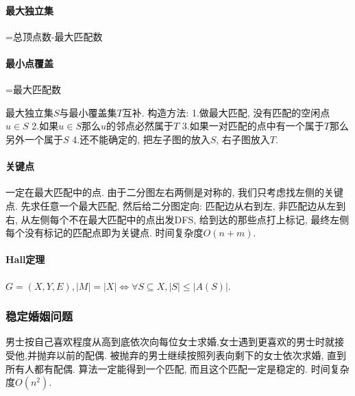        \paragraph{最大独立集}=总顶点数-最大匹配数
        \paragraph{最小点覆盖}=最大匹配数

        最大独立集$S$与最小覆盖集$T$互补. 构造方法: 1.做最大匹配, 没有匹配的空闲点$u\in S$ 2.如果$u\in S$那么$u$的邻点必然属于$T$ 3.如果一对匹配的点中有一个属于$T$那么另外一个属于$S$ 4.还不能确定的, 把左子图的放入$S$, 右子图放入$T$.
        \paragraph{关键点} 一定在最大匹配中的点. 由于二分图左右两侧是对称的, 我们只考虑找左侧的关键点. 先求任意一个最大匹配, 然后给二分图定向: 匹配边从右到左, 非匹配边从左到右, 从左侧每个不在最大匹配中的点出发DFS, 给到达的那些点打上标记, 最终左侧每个没有标记的匹配点即为关键点. 时间复杂度$O(n+m)$. 
        \paragraph{Hall定理}$G=(X,Y,E), |M|=|X| \Leftrightarrow \forall S \subseteq X, |S| \leq |A(S)|$. 

\subsubsection{稳定婚姻问题}
         男士按自己喜欢程度从高到底依次向每位女士求婚,女士遇到更喜欢的男士时就接受他,并抛弃以前的配偶. 被抛弃的男士继续按照列表向剩下的女士依次求婚, 直到所有人都有配偶. 算法一定能得到一个匹配, 而且这个匹配一定是稳定的. 时间复杂度$O(n^2)$. 

